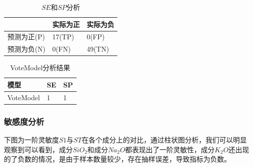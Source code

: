 \documentclass[UTF8]{ctexart}
\begin{document}
\begin{table}[H]
    \centering
	\caption{$SE$和$SP$分析}
    \begin{tabular}{|l|l|l|}
    \hline
           & 实际为正 & 实际为负  \\ \hline
        预测为正(P) & 17(TP) &0(FP) \\ \hline
        预测为负(N) & 0(FN) &49(TN) \\ \hline
    \end{tabular}
\end{table}

\begin{table}[H]
    \centering
	\caption{VoteModel分析结果}
    \begin{tabular}{|l|l|l|}
    \hline
         模型  & SE & SP  \\ \hline
        VoteModel & 1& 1 \\ \hline
    \end{tabular}
\end{table}
\subsubsection{敏感度分析}
下图为一阶灵敏度$S1$与$ST$在各个成分上的对比，通过柱状图分析，我们可以明显观察到可以看到，成分$SiO_2$和成分$Na_2O$都表现出了一阶灵敏性，成分$K_2O$还出现的了负数的情况，是由于样本数量较少，存在抽样误差，导致指标为负数。
\end{document}
